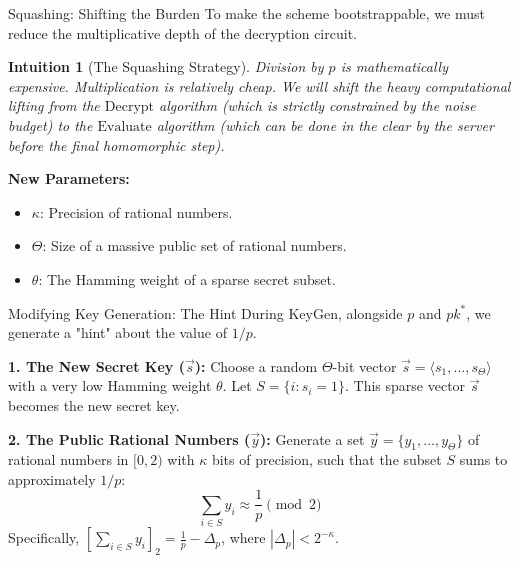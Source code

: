 \documentclass[10pt, aspectratio=169]{beamer}
\newtheorem{intuition}{Intuition}
\begin{document}
\begin{frame}{Squashing: Shifting the Burden}
    To make the scheme bootstrappable, we must reduce the multiplicative depth of the decryption circuit.
    \pause
    
    \vspace{0.3cm}
    \begin{intuition}[The Squashing Strategy]
    Division by $p$ is mathematically expensive. Multiplication is relatively cheap. We will shift the heavy computational lifting from the $\text{Decrypt}$ algorithm (which is strictly constrained by the noise budget) to the $\text{Evaluate}$ algorithm (which can be done in the clear by the server \textit{before} the final homomorphic step).
    \end{intuition}
    \pause
    
    \vspace{0.3cm}
    \textbf{New Parameters:}
    \begin{itemize}
        \item $\kappa$: Precision of rational numbers.
        \item $\Theta$: Size of a massive public set of rational numbers.
        \item $\theta$: The Hamming weight of a sparse secret subset.
    \end{itemize}
\end{frame}

\begin{frame}{Modifying Key Generation: The Hint}
    During KeyGen, alongside $p$ and $pk^*$, we generate a "hint" about the value of $1/p$.
    \pause

    \vspace{0.2cm}
    \textbf{1. The New Secret Key ($\vec{s}$):}
    Choose a random $\Theta$-bit vector $\vec{s} = \langle s_1, \dots, s_\Theta \rangle$ with a very low Hamming weight $\theta$. 
    Let $S = \{i : s_i = 1\}$. This sparse vector $\vec{s}$ becomes the new secret key.
    \pause

    \vspace{0.2cm}
    \textbf{2. The Public Rational Numbers ($\vec{y}$):}
    Generate a set $\vec{y} = \{y_1, \dots, y_\Theta\}$ of rational numbers in $[0, 2)$ with $\kappa$ bits of precision, such that the subset $S$ sums to approximately $1/p$:
    $$\sum_{i \in S} y_i \approx \frac{1}{p} \pmod 2$$
    Specifically, $\left[ \sum_{i \in S} y_i \right]_2 = \frac{1}{p} - \Delta_p$, where $|\Delta_p| < 2^{-\kappa}$.
\end{frame}
\end{document}
